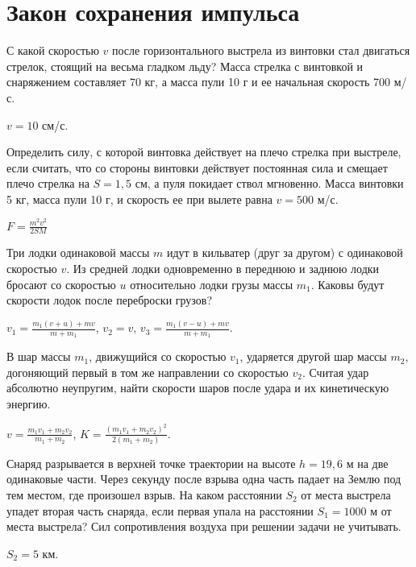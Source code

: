 \section{Закон сохранения импульса}

\introProblems

\begin{ex} %
С какой скоростью $v$ после горизонтального выстрела из винтовки стал двигаться стрелок, стоящий на весьма гладком льду? Масса стрелка с винтовкой и снаряжением составляет 70 кг, а масса пули 10 г и ее начальная скорость 700 м/с.
\begin{ans}
$v=10$ см/с.
\end{ans}
\end{ex}

\begin{ex} %
Определить силу, с которой винтовка действует на плечо стрелка при выстреле, если считать, что со стороны винтовки действует постоянная сила и смещает плечо стрелка на $S = 1,5$ см, а пуля покидает ствол мгновенно. Масса винтовки 5 кг, масса пули 10 г, и скорость ее при вылете равна $v = 500$ м/с.
\begin{ans}
$F = \frac{m^2 v^2}{2SM}$
\end{ans}
\end{ex}

\begin{ex} %
Три лодки одинаковой массы $m$ идут в кильватер (друг за другом) с одинаковой скоростью $v$. Из средней лодки одновременно в переднюю и заднюю лодки бросают со скоростью $u$ относительно лодки грузы массы $m_1$. Каковы будут скорости лодок после переброски грузов?
\begin{ans}
$v_1 = \frac{m_1(v+u)+mv}{m+m_1}$, $v_2 = v$, $v_3 = \frac{m_1(v-u)+mv}{m+m_1}$.
\end{ans}
\end{ex}

\begin{ex} %
В шар массы $m_1$, движущийся со скоростью $v_1$, ударяется другой шар массы $m_2$, догоняющий первый в том же направлении со скоростью $v_2$. Считая удар абсолютно неупругим, найти скорости шаров после удара и их кинетическую энергию.
\begin{ans}
$v = \frac{m_1v_1 + m_2v_2}{m_1+m_2}$, $K = \frac{(m_1v_1+m_2v_2)^2}{2(m_1+m_2)}$.
\end{ans}
\end{ex}

\begin{ex} %
Снаряд разрывается в верхней точке траектории на высоте $h = 19,6$ м на две одинаковые части. Через секунду после взрыва одна часть падает на Землю под тем местом, где произошел взрыв. На каком расстоянии $S_2$ от места выстрела упадет вторая часть снаряда, если первая упала на расстоянии $S_1 = 1000$ м от места выстрела? Сил сопротивления воздуха при решении задачи не учитывать.
\begin{ans}
$S_2 = 5$ км.
\end{ans}
\end{ex}

